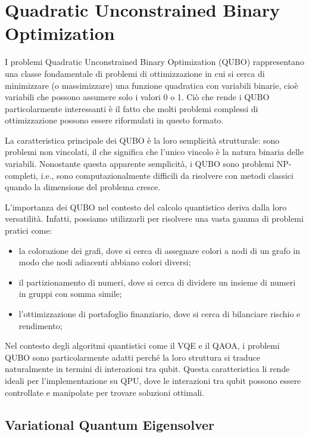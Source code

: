 \section{Quadratic Unconstrained Binary Optimization}\label{sec:algoritmi}

I problemi Quadratic Unconstrained Binary Optimization (QUBO) rappresentano una 
classe fondamentale di problemi di ottimizzazione in cui si cerca di minimizzare 
(o massimizzare) una funzione quadratica con variabili binarie, cioè variabili 
che possono assumere solo i valori 0 o 1. Ciò che rende i QUBO particolarmente 
interessanti è il fatto che molti problemi complessi di ottimizzazione possono 
essere riformulati in questo formato.

La caratteristica principale dei QUBO è la loro semplicità strutturale: sono 
problemi non vincolati, il che significa che l'unico vincolo è la natura binaria 
delle variabili. Nonostante questa apparente semplicità, i QUBO sono problemi 
NP-completi, i.e., sono computazionalmente difficili da risolvere 
con metodi classici quando la dimensione del problema cresce.

L'importanza dei QUBO nel contesto del calcolo quantistico deriva dalla loro 
versatilità. Infatti, possiamo utilizzarli per risolvere una vasta gamma di 
problemi pratici come:

\begin{itemize}
    \item la colorazione dei grafi, dove si cerca di assegnare colori a nodi di 
        un grafo in modo che nodi adiacenti abbiano colori diversi;
    \item il partizionamento di numeri, dove si cerca di dividere un insieme di 
        numeri in gruppi con somma simile;
    \item l'ottimizzazione di portafoglio finanziario, dove si cerca di bilanciare 
        rischio e rendimento;
\end{itemize}

Nel contesto degli algoritmi quantistici come il VQE e il QAOA, i problemi QUBO sono 
particolarmente adatti perché la loro struttura si traduce naturalmente in termini 
di interazioni tra qubit. Questa caratteristica li rende ideali per 
l'implementazione su QPU, dove le interazioni tra qubit possono 
essere controllate e manipolate per trovare soluzioni ottimali.



\subsection{Variational Quantum Eigensolver}\label{sec:vqe}

